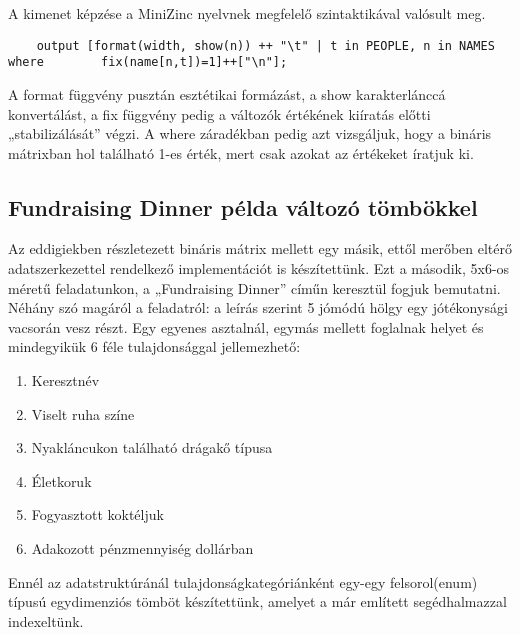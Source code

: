 \documentclass[12pt,a4paper,twoside, openright]{report}
\begin{document}
    A kimenet képzése a MiniZinc nyelvnek megfelelő szintaktikával valósult meg.
    
	\begin{lstlisting}
	output [format(width, show(n)) ++ "\t" | t in PEOPLE, n in NAMES where 		  fix(name[n,t])=1]++["\n"];\end{lstlisting}

    A format függvény pusztán esztétikai formázást, a show karakterlánccá konvertálást, a fix függvény pedig a változók értékének kiíratás előtti „stabilizálását” végzi.
    A where záradékban pedig azt vizsgáljuk, hogy a bináris mátrixban hol található 1-es érték, mert csak azokat az értékeket íratjuk ki.

\subsection{Fundraising Dinner példa változó tömbökkel}
\label{sec_fundraising}

    Az eddigiekben részletezett bináris mátrix mellett egy másik, ettől merőben eltérő adatszerkezettel rendelkező implementációt is készítettünk.
    Ezt a második, 5x6-os méretű feladatunkon, a „Fundraising Dinner” címűn keresztül fogjuk bemutatni.
    Néhány szó magáról a feladatról: a leírás szerint 5 jómódú hölgy egy jótékonysági vacsorán vesz részt.
    Egy egyenes asztalnál, egymás mellett foglalnak helyet és mindegyikük 6 féle tulajdonsággal jellemezhető:
    \begin{enumerate}
    	\item Keresztnév
    	\item Viselt ruha színe
    	\item Nyakláncukon található drágakő típusa
    	\item Életkoruk
    	\item Fogyasztott koktéljuk
    	\item Adakozott pénzmennyiség dollárban
    \end{enumerate}
    Ennél az adatstruktúránál tulajdonságkategóriánként egy-egy felsorol(enum) típusú egydimenziós tömböt készítettünk, amelyet a már említett segédhalmazzal indexeltünk.
\end{document}
